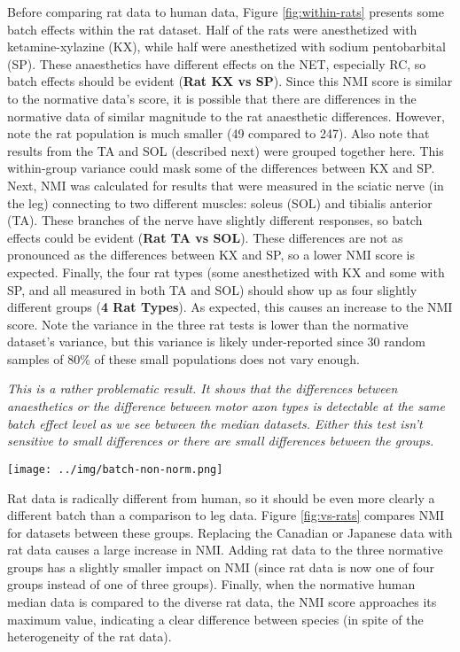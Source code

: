 \documentclass[12pt]{article}
\begin{document}
Before comparing rat data to human data, Figure \ref{fig:within-rats} presents some batch effects within the rat dataset. Half of the rats were anesthetized with ketamine-xylazine (KX), while half were anesthetized with sodium pentobarbital (SP). These anaesthetics have different effects on the NET, especially RC, so batch effects should be evident (\textbf{Rat KX vs SP}). Since this NMI score is similar to the normative data's score, it is possible that there are differences in the normative data of similar magnitude to the rat anaesthetic differences. However, note the rat population is much smaller (49 compared to 247). Also note that results from the TA and SOL (described next) were grouped together here. This within-group variance could mask some of the differences between KX and SP.
Next, NMI was calculated for results that were measured in the sciatic nerve (in the leg) connecting to two different muscles: soleus (SOL) and tibialis anterior (TA). These branches of the nerve have slightly different responses, so batch effects could be evident (\textbf{Rat TA vs SOL}). These differences are not as pronounced as the differences between KX and SP, so a lower NMI score is expected.
Finally, the four rat types (some anesthetized with KX and some with SP, and all measured in both TA and SOL) should show up as four slightly different groups (\textbf{4 Rat Types}). As expected, this causes an increase to the NMI score.
Note the variance in the three rat tests is lower than the normative dataset's variance, but this variance is likely under-reported since 30 random samples of 80\% of these small populations does not vary enough.

\emph{This is a rather problematic result. It shows that the differences between anaesthetics or the difference between motor axon types is detectable at the same batch effect level as we see between the median datasets. Either this test isn't sensitive to small differences or there are small differences between the groups.}

\pagebreak

\begin{figure*}
  \centering
       \texttt{[image: ../img/batch-non-norm.png]}
         \caption{}
  \label{fig:vs-rats}
\end{figure*}

Rat data is radically different from human, so it should be even more clearly a different batch than a comparison to leg data.  Figure \ref{fig:vs-rats} compares NMI for datasets between these groups. Replacing the Canadian or Japanese data with rat data causes a large increase in NMI. Adding rat data to the three normative groups has a slightly smaller impact on NMI (since rat data is now one of four groups instead of one of three groups). Finally, when the normative human median data is compared to the diverse rat data, the NMI score approaches its maximum value, indicating a clear difference between species (in spite of the heterogeneity of the rat data).
\end{document}
